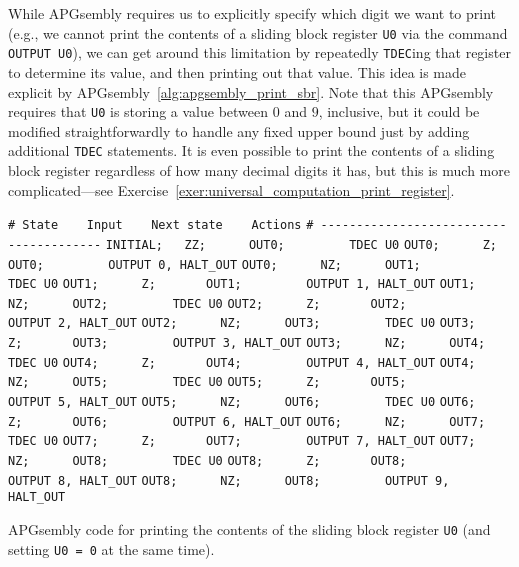 While APGsembly requires us to explicitly specify which digit we want to print (e.g., we cannot print the contents of a sliding block register \texttt{U0} via the command \texttt{OUTPUT U0}), we can get around this limitation by repeatedly \texttt{TDEC}ing that register to determine its value, and then printing out that value. This idea is made explicit by APGsembly~\ref{alg:apgsembly_print_sbr}. Note that this APGsembly requires that \texttt{U0} is storing a value between $0$ and $9$, inclusive, but it could be modified straightforwardly to handle any fixed upper bound just by adding additional \texttt{TDEC} statements. It is even possible to print the contents of a sliding block register regardless of how many decimal digits it has, but this is much more complicated---see Exercise~\ref{exer:universal_computation_print_register}.
 
\begin{apgsembly}
	\begin{algorithmic}\small
		\State \verb|# State    Input    Next state    Actions|
		\State \verb|# ---------------------------------------|
		\State \verb|INITIAL;   ZZ;      OUT0;         TDEC U0|
		\State \verb|OUT0;      Z;       OUT0;         OUTPUT 0, HALT_OUT|
		\State \verb|OUT0;      NZ;      OUT1;         TDEC U0|
		\State \verb|OUT1;      Z;       OUT1;         OUTPUT 1, HALT_OUT|
		\State \verb|OUT1;      NZ;      OUT2;         TDEC U0|
		\State \verb|OUT2;      Z;       OUT2;         OUTPUT 2, HALT_OUT|
		\State \verb|OUT2;      NZ;      OUT3;         TDEC U0|
		\State \verb|OUT3;      Z;       OUT3;         OUTPUT 3, HALT_OUT|
		\State \verb|OUT3;      NZ;      OUT4;         TDEC U0|
		\State \verb|OUT4;      Z;       OUT4;         OUTPUT 4, HALT_OUT|
		\State \verb|OUT4;      NZ;      OUT5;         TDEC U0|
		\State \verb|OUT5;      Z;       OUT5;         OUTPUT 5, HALT_OUT|
		\State \verb|OUT5;      NZ;      OUT6;         TDEC U0|
		\State \verb|OUT6;      Z;       OUT6;         OUTPUT 6, HALT_OUT|
		\State \verb|OUT6;      NZ;      OUT7;         TDEC U0|
		\State \verb|OUT7;      Z;       OUT7;         OUTPUT 7, HALT_OUT|
		\State \verb|OUT7;      NZ;      OUT8;         TDEC U0|
		\State \verb|OUT8;      Z;       OUT8;         OUTPUT 8, HALT_OUT|
		\State \verb|OUT8;      NZ;      OUT8;         OUTPUT 9, HALT_OUT|
	\end{algorithmic}
	\caption{APGsembly code for printing the contents of the sliding block register \texttt{U0} (and setting \texttt{U0 = 0} at the same time).}\label{alg:apgsembly_print_sbr}
\end{apgsembly}




